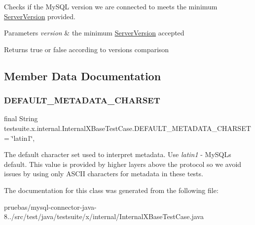 Checks if the My\+S\+QL version we are connected to meets the minimum \mbox{\hyperlink{}{Server\+Version}} provided.


\begin{DoxyParams}{Parameters}
{\em version} & the minimum \mbox{\hyperlink{}{Server\+Version}} accepted \\
\hline
\end{DoxyParams}
\begin{DoxyReturn}{Returns}
true or false according to versions comparison 
\end{DoxyReturn}


\subsection{Member Data Documentation}
\mbox{\label{classtestsuite_1_1x_1_1internal_1_1_internal_x_base_test_case_a9bec716304323fdf5e6ecd55827e7c01}} 
\subsubsection{\texorpdfstring{D\+E\+F\+A\+U\+L\+T\+\_\+\+M\+E\+T\+A\+D\+A\+T\+A\+\_\+\+C\+H\+A\+R\+S\+ET}{DEFAULT\_METADATA\_CHARSET}}
{\footnotesize\ttfamily final String testsuite.\+x.\+internal.\+Internal\+X\+Base\+Test\+Case.\+D\+E\+F\+A\+U\+L\+T\+\_\+\+M\+E\+T\+A\+D\+A\+T\+A\+\_\+\+C\+H\+A\+R\+S\+ET = \char`\"{}latin1\char`\"{}\hspace{0.3cm}{\ttfamily [static]}, {\ttfamily [protected]}}

The default character set used to interpret metadata. Use {\itshape latin1} -\/ My\+S\+QL\textquotesingle{}s default. This value is provided by higher layers above the protocol so we avoid issues by using only A\+S\+C\+II characters for metadata in these tests. 

The documentation for this class was generated from the following file\+:\begin{DoxyCompactItemize}
\item 
pruebas/mysql-\/connector-\/java-\/8../src/test/java/testsuite/x/internal/Internal\+X\+Base\+Test\+Case.\+java\end{DoxyCompactItemize}
